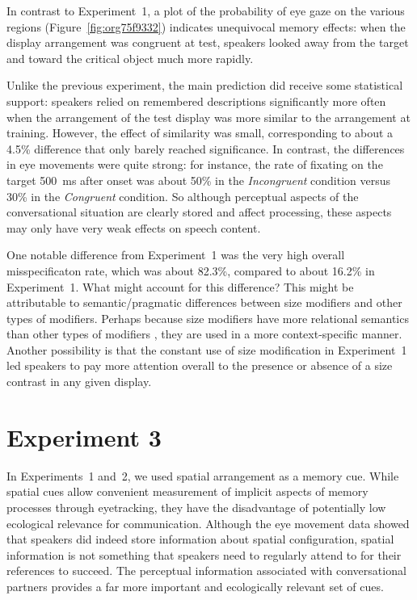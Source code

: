 \documentclass[natbib,doc,a4paper]{apa6}
\begin{document}
In contrast to Experiment~1, a plot of the probability of eye gaze on the various regions (Figure~\ref{fig:org75f9332}) indicates unequivocal memory effects: when the display arrangement was congruent at test, speakers looked away from the target and toward the critical object much more rapidly.

Unlike the previous experiment, the main prediction did receive some statistical support: speakers relied on remembered descriptions significantly more often when the arrangement of the test display was more similar to the arrangement at training.  However, the effect of similarity was small, corresponding to about a 
4.5\%
difference that only barely reached significance. In contrast, the differences in eye movements were quite strong: for instance, the rate of fixating on the target 500~ms after onset was about 50\% in the \emph{Incongruent} condition versus 30\% in the \emph{Congruent} condition. So although perceptual aspects of the conversational situation are clearly stored and affect processing, these aspects may only have very weak effects on speech content.

One notable difference from Experiment~1 was the very high overall misspecificaton rate, which was about 
82.3\%, compared to about 
16.2\% 
in Experiment~1.  What might account for this difference?  This might be attributable to semantic/pragmatic differences between size modifiers and other types of modifiers. Perhaps because size modifiers have more relational semantics than other types of modifiers \citep{GrodnerSedivy2011}, they are used in a more context-specific manner. Another possibility is that the constant use of size modification in Experiment~1 led speakers to pay more attention overall to the presence or absence of a size contrast in any given display.

\section*{Experiment 3}
\label{sec:org770fbad}

In Experiments~1 and~2, we used spatial arrangement as a memory cue. While spatial cues allow convenient measurement of implicit aspects of memory processes through eyetracking, they have the disadvantage of potentially low ecological relevance for communication. Although the eye movement data showed that speakers did indeed store information about spatial configuration, spatial information is not something that speakers need to regularly attend to for their references to succeed. The perceptual information associated with conversational partners provides a far more important and ecologically relevant set of cues.
\end{document}
